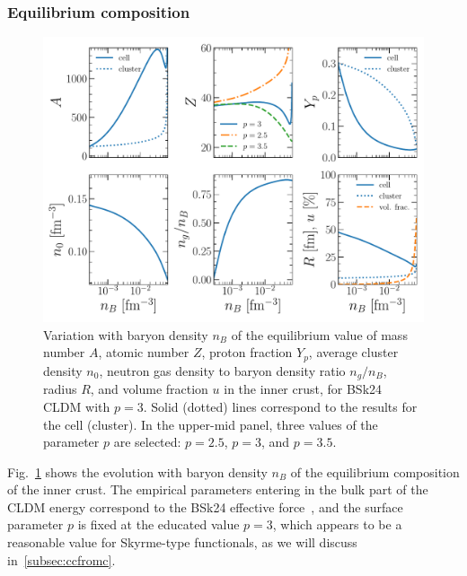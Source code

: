 \subsubsection{Equilibrium composition}

\begin{figure}[!t]
\begin{center}
  \includegraphics[width=0.9\linewidth]{figures/compo_icrust_bsk24.pdf}
\end{center}
\caption[Ground-state composition versus baryon density in the inner crust]{Variation 
  with baryon density $n_B$ of the equilibrium value of mass 
  number $A$, atomic number $Z$, proton fraction $Y_p$, average cluster density
$n_0$, neutron gas density to baryon density ratio $n_g/n_B$, radius $R$, and
volume fraction $u$ in
the inner crust, for BSk24 CLDM with $p=3$. Solid (dotted) lines correspond to 
the results for the cell (cluster). In the upper-mid panel, three values of the
parameter $p$ are selected: $p=2.5$, $p=3$, and $p=3.5$.}\label{fig:compo_icrust_bsk24}
\end{figure}
%
Fig.~\ref{fig:compo_icrust_bsk24} shows the evolution with baryon density $n_B$ 
of the equilibrium composition of the inner crust. The empirical parameters 
entering in the bulk part of the CLDM energy correspond to the BSk24 effective 
force~\cite{Goriely2013}, and the surface parameter $p$ is fixed at the
educated value $p=3$, which appears to be a reasonable value for Skyrme-type 
functionals, as we will discuss in~\ref{subsec:ccfromc}.
 

